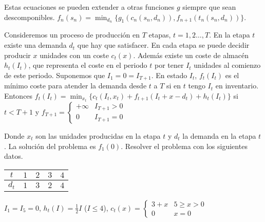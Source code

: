 \documentclass[MIOP.tex]{subfiles}
\begin{document}
Estas ecuaciones se pueden extender a otras funciones $g$ siempre que sean descomponibles.
$f_n(s_n)=\min_{d_n}\{g_1(c_n(s_n,d_n)),f_{n+1}(t_n(s_n,d_n))\}$.
\begin{ejer}
Consideremos un proceso de producción en $T$ etapas, $t=1,2\dots,T$. En la etapa $t$ existe una demanda $d_t$ que hay que satisfacer. En cada etapa se puede decidir producir $x$ unidades  con un coste $c_t(x)$. Además existe un coste de almacén $h_t(I_t)$, que representa el coste en el periodo $t$ por tener $I_t$ unidades al comienzo de este periodo. Suponemos que $I_1=0=I_{T+1}$.  En estado $I_t$, $f_t(I_t)$ es el mínimo coste para atender la demanda desde $t$ a $T$ si en $t$ tengo $I_t$ en inventario. Entonces $f_t(I_t)=\min_{x_t}\{c_t(I_t,x_t)+f_{t+1}(I_t+x-d_t)+h_t(I_t)\}$ si $t<T+1$ y $f_{T+1}=\begin{cases}
+\infty & I_{T+1}>0\\
0 & I_{T+1}=0
\end{cases}$

Donde $x_t$ son las unidades producidas en la etapa $t$ y $d_t$ la demanda en la etapa $t$. La solución del problema es $f_1(0)$. Resolver el problema con los siguientes datos.

\begin{tabular}{|c| c c c c|}
\hline
$t$ & $1$ & $2$ & $3$ & $4$\\
\hline
$d_t$ & $1$ & $3$ & $2$ & $4$\\
\hline

\end{tabular}

$I_1=I_5=0$, $h_t(I)=\frac{1}{2}I$ ($I\leq 4$), $c_t(x)=\begin{cases}
3+x & 5\geq x>0\\
0 & x=0
\end{cases}$
\end{ejer}
\end{document}
